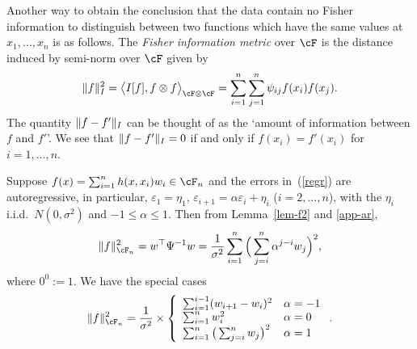\documentclass[preprint,12pt,authoryear]{elsarticle}
\DeclarePairedDelimiter{\norm}{\lVert}{\rVert}
\begin{document}
\begin{remark}
	Another way to obtain the conclusion that the data contain no Fisher information to distinguish between two functions which have the same values at $x_1,\ldots,x_n$ is as follows. 
	The {\em Fisher information metric} over $\cF$ is the distance induced by semi-norm over $\cF$ given by
	\[  \norm{f}_I^2 = \big\langle I[f], f\otimes f \big\rangle_{\cF\otimes\cF} = \sum_{i=1}^n\sum_{j=1}^n\psi_{ij}f(x_i)f(x_j). \]
	The quantity $\norm{f-f'}_I$ can be thought of as the `amount of information between $f$ and $f'$'.
	We see that $\norm{f-f'}_I=0$ if and only if $f(x_i)=f'(x_i)$ for $i=1,\ldots,n$. 
\end{remark}







\begin{example} 
	Suppose $f(x)=\sum_{i=1}^n h(x,x_i)w_i\in\cF_n$ and the errors in~(\ref{regr}) are autoregressive, in particular, $\varepsilon_1=\eta_1$, $\varepsilon_{i+1}=\alpha\varepsilon_{i}+\eta_i$ ($i=2,\ldots,n$), with the $\eta_i$ i.i.d.\  $N(0,\sigma^2)$ and $-1\le\alpha\le 1$.
	Then from Lemma~\ref{lem-f2} and \ref{app-ar},
	\begin{eqnarray*}%
		\norm{f}_{\cF_n}^2 = w^\top\Psi^{-1}w = \frac{1}{\sigma^2}\sum_{i=1}^n\Big(\sum_{j=i}^n\alpha^{j-i}w_j\Big)^2,
	\end{eqnarray*}
	where $0^0:=1$.
	We have the special cases
	\begin{eqnarray*}%
		\norm{f}_{\cF_n}^2 = \frac{1}{\sigma^2}\times
		\left\{
		\begin{array}{ll}
			\sum_{i=1}^{i-1} (w_{i+1}-w_i)^2 & \alpha=-1\\
			\sum_{i=1}^n w_i^2 & \alpha=0\\
			\sum_{i=1}^n\big(\sum_{j=i}^nw_j\big)^2 & \alpha=1
		\end{array}
		\right. .
	\end{eqnarray*}
\end{example}
\end{document}
